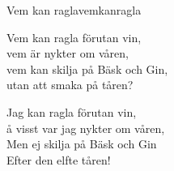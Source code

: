 \begin{song}{Vem kan ragla}{vemkanragla}
\begin{vers}
Vem kan ragla förutan vin,\\
vem är nykter om våren,\\
vem kan skilja på Bäsk och Gin,\\
utan att smaka på tåren?\\
\end{vers}
\begin{vers}
Jag kan ragla förutan vin,\\
å visst var jag nykter om våren,\\
Men ej skilja på Bäsk och Gin\\
Efter den elfte tåren!\\
\end{vers}
\end{song}
